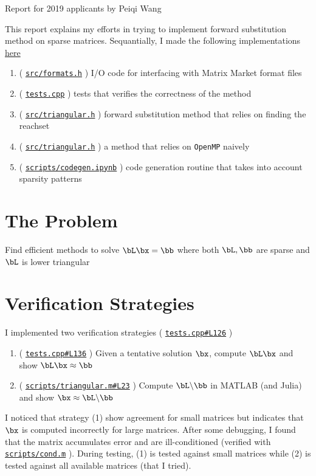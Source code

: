 \documentclass[12pt]{article}
\newcommand{\lgh}[1]{
    \href{https://github.com/tt6746690/sparse_solver/blob/master/#1}{\texttt{#1}}
}
\begin{document}
\begin{center}
    {\Large 
        Report for 2019 applicants by Peiqi Wang
    }
\end{center}
This report explains my efforts in trying to implement forward substitution method on sparse matrices. Sequantially, I made the following implementations \href{https://github.com/tt6746690/sparse_solver}{here}

\begin{enumerate}
    \item (\lgh{src/formats.h}) I/O code for interfacing with Matrix Market format files
    \item (\lgh{tests.cpp}) tests that verifies the correctness of the method
    \item (\lgh{src/triangular.h}) forward substitution method that relies on finding the reachset
    \item (\lgh{src/triangular.h}) a method that relies on \texttt{OpenMP} naively
    \item (\lgh{scripts/codegen.ipynb}) code generation routine that takes into account sparsity patterns
\end{enumerate}


\section{The Problem}

Find efficient methods to solve $\bL\bx = \bb$ where both $\bL, \bb$ are sparse and $\bL$ is lower triangular

\section{Verification Strategies}

I implemented two verification strategies (\lgh{tests.cpp\#L126})
\begin{enumerate}
    \item (\lgh{tests.cpp\#L136}) Given a tentative solution $\bx$, compute $\bL \bx$ and show $\bL\bx \approx \bb$
    \item (\lgh{scripts/triangular.m\#L23}) Compute $\bL \backslash \bb$ in MATLAB (and Julia) and show $\bx \approx \bL \backslash \bb$
\end{enumerate}
I noticed that strategy (1) show agreement for small matrices but indicates that $\bx$ is computed incorrectly for large matrices. After some debugging, I found that the matrix accumulates error and are ill-conditioned (verified with \lgh{scripts/cond.m}). During testing, (1) is tested against small matrices while (2) is tested against all available matrices (that I tried).
\end{document}
